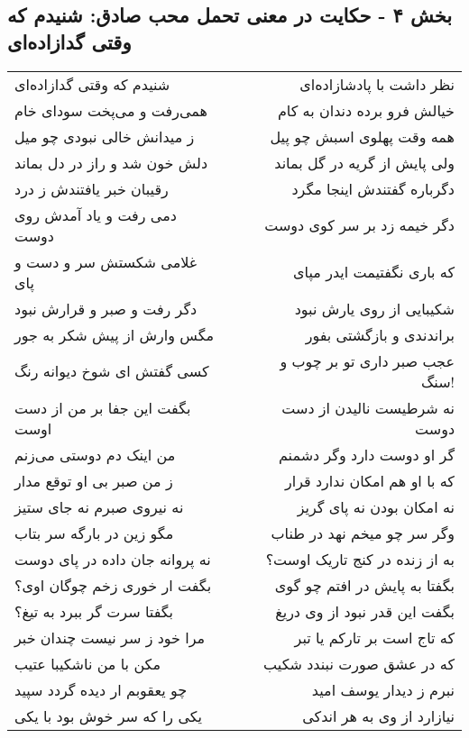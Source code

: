 \begin{center}
\section*{بخش ۴ - حکایت در معنی تحمل محب صادق: شنیدم که وقتی گدازاده‌ای}
\label{sec:004}
\begin{longtable}{l p{0.5cm} r}
شنیدم که وقتی گدازاده‌ای
&&
نظر داشت با پادشازاده‌ای
\\
همی‌رفت و می‌پخت سودای خام
&&
خیالش فرو برده دندان به کام
\\
ز میدانش خالی نبودی چو میل
&&
همه وقت پهلوی اسبش چو پیل
\\
دلش خون شد و راز در دل بماند
&&
ولی پایش از گریه در گل بماند
\\
رقیبان خبر یافتندش ز درد
&&
دگرباره گفتندش اینجا مگرد
\\
دمی رفت و یاد آمدش روی دوست
&&
دگر خیمه زد بر سر کوی دوست
\\
غلامی شکستش سر و دست و پای
&&
که باری نگفتیمت ایدر مپای
\\
دگر رفت و صبر و قرارش نبود
&&
شکیبایی از روی یارش نبود
\\
مگس وارش از پیش شکر به جور
&&
براندندی و بازگشتی بفور
\\
کسی گفتش ای شوخ دیوانه رنگ
&&
عجب صبر داری تو بر چوب و سنگ!
\\
بگفت این جفا بر من از دست اوست
&&
نه شرطیست نالیدن از دست دوست
\\
من اینک دم دوستی می‌زنم
&&
گر او دوست دارد وگر دشمنم
\\
ز من صبر بی او توقع مدار
&&
که با او هم امکان ندارد قرار
\\
نه نیروی صبرم نه جای ستیز
&&
نه امکان بودن نه پای گریز
\\
مگو زین در بارگه سر بتاب
&&
وگر سر چو میخم نهد در طناب
\\
نه پروانه جان داده در پای دوست
&&
به از زنده در کنج تاریک اوست؟
\\
بگفت ار خوری زخم چوگان اوی؟
&&
بگفتا به پایش در افتم چو گوی
\\
بگفتا سرت گر ببرد به تیغ؟
&&
بگفت این قدر نبود از وی دریغ
\\
مرا خود ز سر نیست چندان خبر
&&
که تاج است بر تارکم یا تبر
\\
مکن با من ناشکیبا عتیب
&&
که در عشق صورت نبندد شکیب
\\
چو یعقوبم ار دیده گردد سپید
&&
نبرم ز دیدار یوسف امید
\\
یکی را که سر خوش بود با یکی
&&
نیازارد از وی به هر اندکی
\\

\end{longtable}
\end{center}
